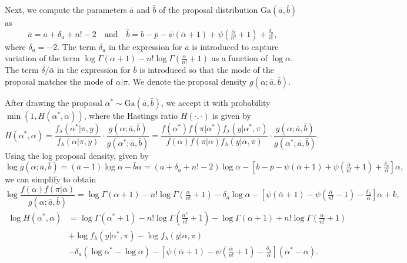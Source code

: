\documentclass[11pt,letter]{article}
\begin{document}
Next, we compute the parameters $\bar a$ and $\bar b$ of the proposal distribution $\mathrm{Ga}(\bar{a},\bar{b})$ as
\[
  \bar{a} = a + \delta_a + n! - 2 \quad \mbox{and} \quad
  \bar{b} = b - \bar{p}
  - \psi(\bar\alpha + 1) + \psi(\tfrac{\bar\alpha}{n!} + 1) + \tfrac{\delta_a}{\bar\alpha},
\]
where $\delta_a = -2$.
The term $\delta_a$ in the expression for $\bar a$ is introduced to capture variation of the term $\log \Gamma(\alpha + 1) - n! \log \Gamma(\tfrac{\alpha}{n!} + 1)$ as a function of $\log \alpha$.
The term $\delta/\bar\alpha$ in the expression for $\bar b$ is introduced so that the mode of the proposal matches the mode of $\alpha|\pi$.
We denote the proposal density $g(\alpha;\bar a, \bar b)$.

After drawing the proposal $\alpha^* \sim \mathrm{Ga}(\bar a, \bar b)$, we accept it with probability $\min(1, H(\alpha^*, \alpha))$, where the Hastings ratio $H(\cdot,\cdot)$ is given by
\[
  H(\alpha^*,\alpha) = \frac{f_\lambda(\alpha^*|\pi,y)}{f_\lambda(\alpha|\pi,y)}
  \cdot \frac{g(\alpha;\bar a,\bar b)}{g(\alpha^*;\bar a, \bar b)}
  = \frac{f(\alpha^*) f(\pi|\alpha^*) f_\lambda(y|\alpha^*,\pi)}
  {f(\alpha) f(\pi|\alpha) f_\lambda(y|\alpha,\pi)}
  \cdot \frac{g(\alpha;\bar a, \bar b)}{g(\alpha^*;\bar a, \bar b)}.
\]
Using the log proposal density, given by
\[
  \log g(\alpha;\bar a, \bar b)
  = (\bar a - 1) \log \alpha - \bar b \alpha
  = (a + \delta_a + n! - 2) \log \alpha
  - [b-\bar{p} - \psi(\bar\alpha + 1) + \psi(\tfrac{\bar\alpha}{n!} + 1)
  + \tfrac{\delta_a}{\bar\alpha}] \alpha,
\]
we can simplify to obtain
\[
  \log \frac{f(\alpha) f(\pi|\alpha)}{g(\alpha;\bar a, \bar b)}
  = \log \Gamma(\alpha + 1) - n! \log \Gamma(\tfrac{\alpha}{n!} + 1)
  - \delta_a \log \alpha - [\psi(\bar\alpha + 1) - \psi(\tfrac{\bar\alpha}{n!} - 1)
  - \tfrac{\delta_a}{\bar\alpha}] \alpha + k,
\]
\begin{equation}\begin{aligned}
  \log H(\alpha^*,\alpha)
  &= \log \Gamma(\alpha^* + 1) - n! \log \Gamma(\tfrac{\alpha^*}{n!} + 1)
  - \log \Gamma(\alpha + 1) + n! \log \Gamma(\tfrac{\alpha}{n!} + 1) \\
  &+ \log f_\lambda(y|\alpha^*,\pi) - \log f_\lambda(y|\alpha,\pi) \\
  &- \delta_a (\log \alpha^* - \log \alpha)
  - [\psi(\bar\alpha + 1) - \psi(\tfrac{\bar\alpha}{n!} + 1)
  - \tfrac{\delta_a}{\bar\alpha}] (\alpha^* - \alpha).
\end{aligned}\end{equation}



\end{document}
